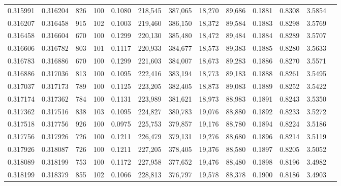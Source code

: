 \begin{tabular}{rrrrrrrrrrrrr}
0.315991 & 0.316204 &   826 & 100 &                                     0.1080 & 218,545 & 387,065 &  18,270 &  89,686 & 0.1881 & 0.8308 & 3.5854 \\
0.316207 & 0.316458 &   915 & 102 &                                     0.1003 & 219,460 & 386,150 &  18,372 &  89,584 & 0.1883 & 0.8298 & 3.5769 \\
0.316458 & 0.316604 &   670 & 100 &                                     0.1299 & 220,130 & 385,480 &  18,472 &  89,484 & 0.1884 & 0.8289 & 3.5707 \\
0.316606 & 0.316782 &   803 & 101 &                                     0.1117 & 220,933 & 384,677 &  18,573 &  89,383 & 0.1885 & 0.8280 & 3.5633 \\
0.316783 & 0.316886 &   670 & 100 &                                     0.1299 & 221,603 & 384,007 &  18,673 &  89,283 & 0.1886 & 0.8270 & 3.5571 \\
0.316886 & 0.317036 &   813 & 100 &                                     0.1095 & 222,416 & 383,194 &  18,773 &  89,183 & 0.1888 & 0.8261 & 3.5495 \\
0.317037 & 0.317173 &   789 & 100 &                                     0.1125 & 223,205 & 382,405 &  18,873 &  89,083 & 0.1889 & 0.8252 & 3.5422 \\
0.317174 & 0.317362 &   784 & 100 &                                     0.1131 & 223,989 & 381,621 &  18,973 &  88,983 & 0.1891 & 0.8243 & 3.5350 \\
0.317362 & 0.317516 &   838 & 103 &                                     0.1095 & 224,827 & 380,783 &  19,076 &  88,880 & 0.1892 & 0.8233 & 3.5272 \\
0.317518 & 0.317756 &   926 & 100 &                                     0.0975 & 225,753 & 379,857 &  19,176 &  88,780 & 0.1894 & 0.8224 & 3.5186 \\
0.317756 & 0.317926 &   726 & 100 &                                     0.1211 & 226,479 & 379,131 &  19,276 &  88,680 & 0.1896 & 0.8214 & 3.5119 \\
0.317926 & 0.318087 &   726 & 100 &                                     0.1211 & 227,205 & 378,405 &  19,376 &  88,580 & 0.1897 & 0.8205 & 3.5052 \\
0.318089 & 0.318199 &   753 & 100 &                                     0.1172 & 227,958 & 377,652 &  19,476 &  88,480 & 0.1898 & 0.8196 & 3.4982 \\
0.318199 & 0.318379 &   855 & 102 &                                     0.1066 & 228,813 & 376,797 &  19,578 &  88,378 & 0.1900 & 0.8186 & 3.4903 \\

\end{tabular}
